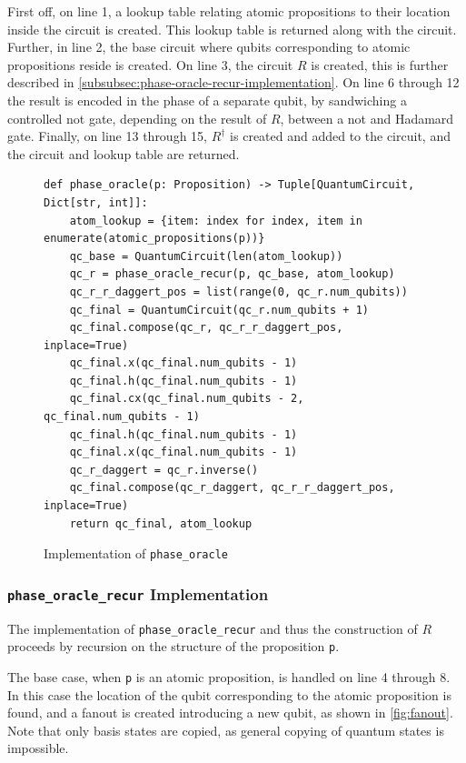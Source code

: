 First off, on line 1, a lookup table relating atomic propositions to their location inside the circuit is created.
This lookup table is returned along with the circuit.
Further, in line 2, the base circuit where qubits corresponding to atomic propositions reside is created.
On line 3, the circuit $R$ is created, this is further described in \autoref{subsubsec:phase-oracle-recur-implementation}.
On line 6 through 12 the result is encoded in the phase of a separate qubit, by sandwiching a controlled not gate, depending on the result of $R$, between a not and Hadamard gate.
Finally, on line 13 through 15, $R^\dagger$ is created and added to the circuit, and the circuit and lookup table are returned.

\begin{figure}[H]
\centering
\begin{verbatim}
def phase_oracle(p: Proposition) -> Tuple[QuantumCircuit, Dict[str, int]]:
    atom_lookup = {item: index for index, item in enumerate(atomic_propositions(p))}
    qc_base = QuantumCircuit(len(atom_lookup))
    qc_r = phase_oracle_recur(p, qc_base, atom_lookup)
    qc_r_r_daggert_pos = list(range(0, qc_r.num_qubits))
    qc_final = QuantumCircuit(qc_r.num_qubits + 1)
    qc_final.compose(qc_r, qc_r_r_daggert_pos, inplace=True)
    qc_final.x(qc_final.num_qubits - 1)
    qc_final.h(qc_final.num_qubits - 1)
    qc_final.cx(qc_final.num_qubits - 2, qc_final.num_qubits - 1)
    qc_final.h(qc_final.num_qubits - 1)
    qc_final.x(qc_final.num_qubits - 1)
    qc_r_daggert = qc_r.inverse()
    qc_final.compose(qc_r_daggert, qc_r_r_daggert_pos, inplace=True)
    return qc_final, atom_lookup
\end{verbatim}
\caption{Implementation of \texttt{phase_oracle} }
\label{fig:phase_oracle}
\end{figure}

\subsubsection{\texttt{phase\_oracle\_recur} Implementation}\label{subsubsec:phase-oracle-recur-implementation}

The implementation of \texttt{phase\_oracle\_recur} and thus the construction of $R$ proceeds by recursion on the structure of the proposition \texttt{p}.

The base case, when \texttt{p} is an atomic proposition, is handled on line 4 through 8.
In this case the location of the qubit corresponding to the atomic proposition is found, and a fanout is created introducing a new qubit, as shown in \autoref{fig:fanout}.
Note that only basis states are copied, as general copying of quantum states is impossible.

